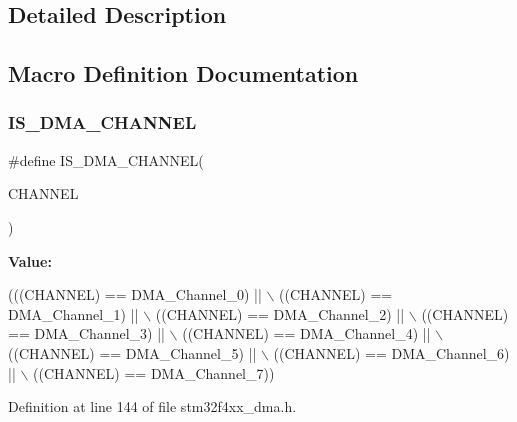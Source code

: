 \subsection{Detailed Description}


\subsection{Macro Definition Documentation}
\mbox{\label{group___d_m_a__channel_gac7f4709d9244f25b853789d888a74d46}} 
\subsubsection{\texorpdfstring{I\+S\+\_\+\+D\+M\+A\+\_\+\+C\+H\+A\+N\+N\+EL}{IS\_DMA\_CHANNEL}}
{\footnotesize\ttfamily \#define I\+S\+\_\+\+D\+M\+A\+\_\+\+C\+H\+A\+N\+N\+EL(\begin{DoxyParamCaption}\item[{}]{C\+H\+A\+N\+N\+EL }\end{DoxyParamCaption})}

{\bfseries Value\+:}
\begin{DoxyCode}
(((CHANNEL) == DMA\_Channel\_0) || \(\backslash\)
                                 ((CHANNEL) == DMA\_Channel\_1) || \(\backslash\)
                                 ((CHANNEL) == DMA\_Channel\_2) || \(\backslash\)
                                 ((CHANNEL) == DMA\_Channel\_3) || \(\backslash\)
                                 ((CHANNEL) == DMA\_Channel\_4) || \(\backslash\)
                                 ((CHANNEL) == DMA\_Channel\_5) || \(\backslash\)
                                 ((CHANNEL) == DMA\_Channel\_6) || \(\backslash\)
                                 ((CHANNEL) == DMA\_Channel\_7))
\end{DoxyCode}


Definition at line 144 of file stm32f4xx\+\_\+dma.\+h.

